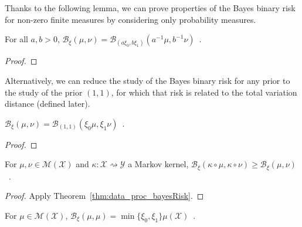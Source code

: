 Thanks to the following lemma, we can prove properties of the Bayes binary risk for non-zero finite measures by considering only probability measures.


\begin{lemma}
  \label{lem:bayesBinaryRisk_mul}
  \leanok
  For all $a, b > 0$, $\mathcal B_\xi(\mu, \nu) = \mathcal B_{(a \xi_0, b \xi_1)}(a^{-1} \mu, b^{-1} \nu)$~.
\end{lemma}

\begin{proof}\leanok
\uses{}

\end{proof}

Alternatively, we can reduce the study of the Bayes binary risk for any prior to the study of the prior $(1, 1)$, for which that risk is related to the total variation distance (defined later).


\begin{lemma}
  \label{lem:bayesBinaryRisk_one_one}
  \leanok
  $\mathcal B_\xi(\mu, \nu) = \mathcal B_{(1,1)}(\xi_0\mu, \xi_1\nu)$~.
\end{lemma}

\begin{proof}\leanok
{}
\end{proof}


\begin{theorem}
  \label{thm:data_proc_bayesBinaryRisk}
  \leanok
  For $\mu, \nu \in \mathcal M(\mathcal X)$ and $\kappa : \mathcal X \rightsquigarrow \mathcal Y$ a Markov kernel, $\mathcal B_\xi(\kappa \circ \mu, \kappa \circ \nu) \ge \mathcal B_\xi(\mu, \nu)$~.
\end{theorem}

\begin{proof}\leanok
{}
Apply Theorem~\ref{thm:data_proc_bayesRisk}.
\end{proof}


\begin{lemma}
  \label{lem:bayesBinaryRisk_self}
  \leanok
  For $\mu \in \mathcal M(\mathcal X)$, $\mathcal B_\xi(\mu, \mu) = \min\{\xi_0, \xi_1\} \mu(\mathcal X)$~.
\end{lemma}

